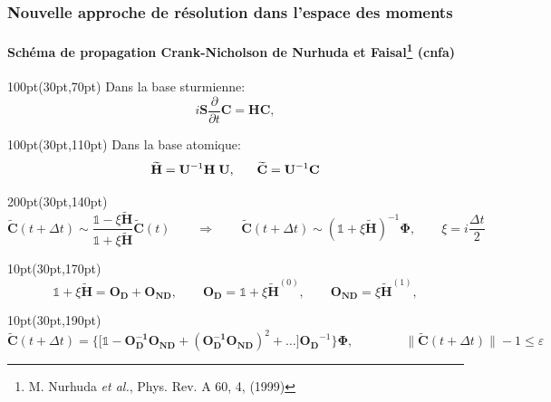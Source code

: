 \begin{frame}
 \frametitle{Nouvelle approche de r\'esolution dans l'espace des moments}
 \framesubtitle{Sch\'ema de propagation Crank-Nicholson de Nurhuda 
et Faisal\footnote{\Tiny M. Nurhuda \textit{et al.}, Phys. Rev. A 60, 4, (1999)} (\acrshort{cnfa})}


\begin{textblock*}{100pt}(30pt,70pt)
\footnotesize
Dans la base sturmienne:
\begin{equation*}
i\mathbf{S}\frac{\partial}{\partial t}\mathbf{C} = \mathbf{H}\mathbf{C}, 
\end{equation*}

\end{textblock*}

\begin{textblock*}{100pt}(30pt,110pt)
\footnotesize
Dans la base atomique:
\begin{equation*} 
\footnotesize
\widetilde{\mathbf{H}} = \mathbf{U}^{-1} \mathbf{H}\;\mathbf{U}, 
  \qquad\widetilde{\mathbf{C}} =  \mathbf{U}^{-1}{\mathbf{C}} 
\end{equation*}
 
\end{textblock*}


\begin{textblock*}{200pt}(30pt,140pt)
\footnotesize
\begin{equation*}
 \widetilde{\mathbf{C}}(t+\Delta t)
   \sim \frac{\boldsymbol{\mathds{1}}-\xi\widetilde{\mathbf{H}}}
{\boldsymbol{\mathds{1}}+\xi\widetilde{\mathbf{H}}}\widetilde{\mathbf{C}}(t) \qquad\Longrightarrow\qquad  \widetilde{\mathbf{C}}(t+\Delta t)
\sim (\boldsymbol{\mathds{1}}+\xi\widetilde{\mathbf{H}})^{-1} \mathbf{\Phi},
\qquad \xi = i\frac{\Delta t}{2}
\end{equation*}

\end{textblock*}


\begin{textblock*}{10pt}(30pt,170pt)
\footnotesize
\begin{equation*}
\mathds{1}+\xi\widetilde{\mathbf{H}} = \mathbf{O_D} + \mathbf{O_{ND}},\qquad
\mathbf{O_D} = \mathbf{\mathds{1}}+\xi\widetilde{\mathbf{H}}^{(0)},
 \qquad \mathbf{O_{ND}} = \xi\widetilde{\mathbf{H}}^{(1)},
\end{equation*}

\end{textblock*}

\begin{textblock*}{10pt}(30pt,190pt)
\footnotesize
\begin{equation*}
 \widetilde{\mathbf{C}}(t+\Delta t) = 
 \Bigg\lbrace\Big[\mathds{1}-\mathbf{O_D^{-1}}\mathbf{O_{ND}} 
+\left(\mathbf{O_D^{-1}}\mathbf{O_{ND}}\right)^2
  +\ldots \Big]\mathbf{O_D}^{-1} \Bigg\rbrace \mathbf{\Phi}, 
  \qquad\qquad \big\| \widetilde{\mathbf{C}}(t+\Delta t) \big\| - 1 \leqslant \varepsilon
\end{equation*}


\end{textblock*}
\end{frame}
